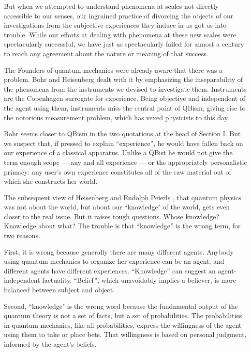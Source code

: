 \documentclass[aps,prb,superscriptaddress,12pt,tightenlines,nofootinbib]{revtex4-2}
\begin{document}
But when we attempted to understand phenomena at scales not directly accessible to our senses, our ingrained practice of divorcing the objects of our investigations from the subjective experiences they induce in us got us into trouble.  While our efforts at dealing with phenomena at these new scales were spectacularly successful, we have just as spectacularly failed for almost a century to reach any agreement about the nature or meaning of that success.

The Founders of quantum mechanics were already aware that there was a  problem.   Bohr and Heisenberg  dealt with it by emphasizing the inseparability of the phenomena  from the instruments we devised to investigate them.   Instruments are the Copenhagen surrogate for experience.   Being objective and independent of the agent using them, instruments miss the central point of QBism,  giving rise to the notorious measurement problem, which has vexed physicists to this day.

Bohr seems closer to QBism in the two quotations at the head of Section I.  But we suspect that, if pressed to explain ``experience'', he would have fallen back on our experience of a classical apparatus. Unlike                                %
 a QBist he would not give the term enough scope --- any and all experience --- or the appropriately personalistic primacy:  any user's  own experience constitutes all of the raw material out of which she constructs her world.

The subsequent view of Heisenberg \cite{Heisenberg2000} and Rudolph Peierls \cite{Peierls1991}, that quantum physics was not about the world, but about our ``knowledge" of the world, gets even closer to the real issue.  But it raises tough questions.    Whose knowledge?    Knowledge about what?   The trouble is that ``knowledge'' is the wrong term,  for two reasons.

First, it is wrong because  generally there are many different agents.   Anybody using quantum mechanics to organize her experience can be an agent, and different agents have different experiences.   ``Knowledge''   can suggest an agent-independent factuality.  ``Belief$\,$", which unavoidably  implies a believer,  is more balanced between subject and object.

Second, ``knowledge" is the wrong word because the fundamental output of the quantum theory is not a set of facts, but a set of probabilities.   The probabilities in quantum mechanics, like all probabilities,  express the willingness of the agent using them  to take or place bets.   That willingness is based on  personal judgment, informed by  the agent's beliefs.
\end{document}
